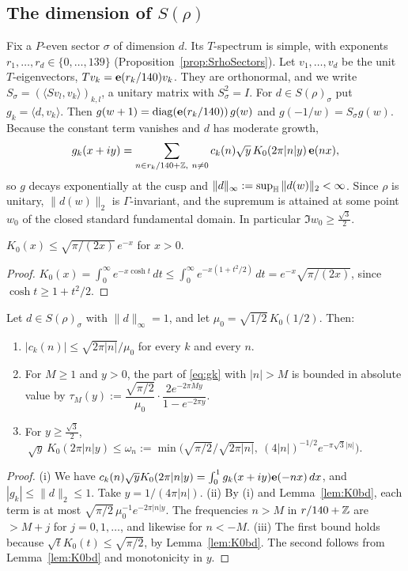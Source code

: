 \subsection{The dimension of $S(\rho)$}\label{sec:Srhocert}
Fix a $P$-even sector $\sigma$ of dimension $d$. Its $T$-spectrum is simple, with exponents $r_1,\dots,r_d\in\{0,\dots,139\}$ (Proposition~\ref{prop:SrhoSectors}). Let
$v_1,\dots,v_d$ be the unit $T$-eigenvectors, $Tv_k=\mathbf{e}(r_k/140)v_k$. They are orthonormal, and we write $S_\sigma=(\langle Sv_l,v_k\rangle)_{k,l}$, a unitary matrix with $S_\sigma^2=I$. For
$d\in S(\rho)_\sigma$ put $g_k=\langle d,v_k\rangle$. Then $g(w+1)=\mathrm{diag}(\mathbf{e}(r_k/140))\,g(w)$ and $g(-1/w)=S_\sigma g(w)$. Because the constant term vanishes and $d$ has moderate growth,
\begin{equation}\label{eq:gk}
g_k(x+iy)=\sum_{n\in r_k/140+\mathbb{Z},\ n\neq0}c_k(n)\sqrt y\,K_0(2\pi|n|y)\,\mathbf{e}(nx),
\end{equation}
so $g$ decays exponentially at the cusp and $\|d\|_\infty:=\sup_{\mathbb{H}}\|d(w)\|_2<\infty$. Since $\rho$ is unitary, $\|d(w)\|_2$ is $\Gamma$-invariant, and the supremum is attained at some point
$w_0$ of the closed standard fundamental domain. In particular $\Im w_0\ge\tfrac{\sqrt3}2$.

\begin{lemma}\label{lem:K0bd}
$K_0(x)\le\sqrt{\pi/(2x)}\,e^{-x}$ for $x>0$.
\end{lemma}
\begin{proof}
$K_0(x)=\int_0^\infty e^{-x\cosh t}\,dt\le\int_0^\infty e^{-x(1+t^2/2)}\,dt=e^{-x}\sqrt{\pi/(2x)}$, since $\cosh t\ge1+t^2/2$.
\end{proof}

\begin{lemma}\label{lem:apriori}
Let $d\in S(\rho)_\sigma$ with $\|d\|_\infty=1$, and let $\mu_0=\sqrt{1/2}\,K_0(1/2)$. Then:
\begin{enumerate}[label=(\roman*)]
\item $|c_k(n)|\le\sqrt{2\pi|n|}/\mu_0$ for every $k$ and every $n$.
\item For $M\ge1$ and $y>0$, the part of \eqref{eq:gk} with $|n|>M$ is bounded in absolute value by
$\tau_M(y):=\dfrac{\sqrt{\pi/2}}{\mu_0}\cdot\dfrac{2e^{-2\pi My}}{1-e^{-2\pi y}}$.
\item For $y\ge\tfrac{\sqrt3}2$, $\ \sqrt y\,K_0(2\pi|n|y)\le\omega_n:=\min\bigl(\sqrt{\pi/2}/\sqrt{2\pi|n|},\ (4|n|)^{-1/2}e^{-\pi\sqrt3|n|}\bigr)$.
\end{enumerate}
\end{lemma}
\begin{proof}
(i) We have $c_k(n)\sqrt yK_0(2\pi|n|y)=\int_0^1g_k(x+iy)\mathbf{e}(-nx)\,dx$, and $|g_k|\le\|d\|_2\le1$. Take $y=1/(4\pi|n|)$.
(ii) By (i) and Lemma~\ref{lem:K0bd}, each term is at most $\sqrt{\pi/2}\,\mu_0^{-1}e^{-2\pi|n|y}$. The frequencies $n>M$ in $r/140+\mathbb{Z}$ are $>M+j$ for $j=0,1,\dots$, and likewise for $n<-M$.
(iii) The first bound holds because $\sqrt tK_0(t)\le\sqrt{\pi/2}$, by Lemma~\ref{lem:K0bd}. The second follows from Lemma~\ref{lem:K0bd} and monotonicity in $y$.
\end{proof}

